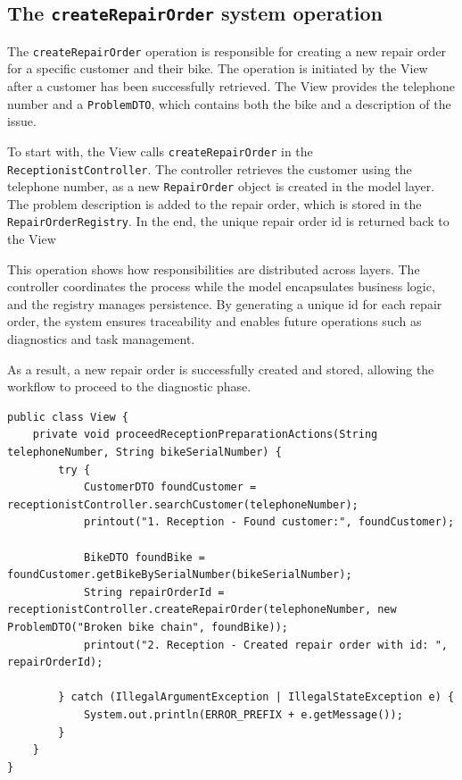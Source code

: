 \documentclass[a4paper]{scrartcl}
\begin{document}
\subsection{The \texttt{createRepairOrder} system operation}

The \texttt{createRepairOrder} operation is responsible for creating a new repair order for a specific customer and their bike. The operation is initiated by the View after a customer has been successfully retrieved. The View provides the telephone number and a \texttt{ProblemDTO}, which contains both the bike and a description of the issue.

To start with, the View calls \texttt{createRepairOrder} in the \texttt{ReceptionistController}. The controller retrieves the customer using the telephone number, as a new \texttt{RepairOrder} object is created in the model layer. The problem description is added to the repair order, which is stored in the \texttt{RepairOrderRegistry}. In the end, the unique repair order id is returned back to the View

This operation shows how responsibilities are distributed across layers. The controller coordinates the process while the model encapsulates business logic, and the registry manages persistence. By generating a unique id for each repair order, the system ensures traceability and enables future operations such as diagnostics and task management.

As a result, a new repair order is successfully created and stored, allowing the workflow to proceed to the diagnostic phase.

\begin{lstlisting}[style=javastyle, caption={Main class entry point}]
public class View {
    private void proceedReceptionPreparationActions(String telephoneNumber, String bikeSerialNumber) {
        try {
            CustomerDTO foundCustomer = receptionistController.searchCustomer(telephoneNumber);
            printout("1. Reception - Found customer:", foundCustomer);

            BikeDTO foundBike = foundCustomer.getBikeBySerialNumber(bikeSerialNumber);
            String repairOrderId = receptionistController.createRepairOrder(telephoneNumber, new ProblemDTO("Broken bike chain", foundBike));
            printout("2. Reception - Created repair order with id: ", repairOrderId);

        } catch (IllegalArgumentException | IllegalStateException e) {
            System.out.println(ERROR_PREFIX + e.getMessage());
        }
    }
}
\end{lstlisting}
\end{document}
